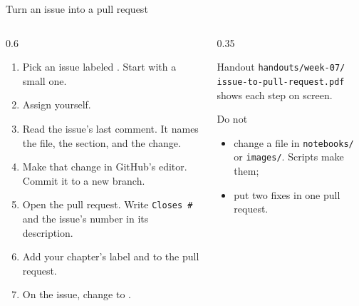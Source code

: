 \documentclass[9pt,aspectratio=169]{beamer}
\begin{document}
\begin{frame}{Turn an issue into a pull request}
    \begin{columns}[T]
        \begin{column}{0.6\textwidth}
            \begin{enumerate}\small
                \item Pick an issue labeled . Start with a small one.
                \item Assign yourself.
                \item Read the issue's last comment. It names the file, the section, and the change.
                \item Make that change in GitHub's editor. Commit it to a new branch.
                \item Open the pull request. Write \texttt{Closes \#} and the issue's number in its description.
                \item Add your chapter's label and  to the pull request.
                \item On the issue, change  to .
            \end{enumerate}
        \end{column}
        \begin{column}{0.35\textwidth}
            \begin{block}{Handout}
                \small \texttt{handouts/week-07/}\\\texttt{issue-to-pull-request.pdf} shows each step on screen.
            \end{block}
            \begin{alertblock}{Do not}
                \small
                \begin{itemize}
                    \item change a file in \texttt{notebooks/} or \texttt{images/}. Scripts make them;
                    \item put two fixes in one pull request.
                \end{itemize}
            \end{alertblock}
        \end{column}
    \end{columns}
\end{frame}
\end{document}
